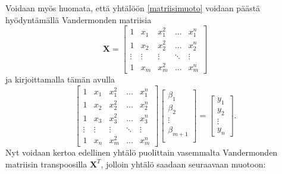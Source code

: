 \documentclass[12pt,a4paper,titlepage]{article}
\newcommand{\matr}[1]{\bm{#1}}
\newcommand{\transpose}[1]{{#1}^T}
\begin{document}
Voidaan myös huomata, että yhtälöön \ref{matriisimuoto} voidaan päästä hyödyntämällä Vandermonden matriisia \cite{vandermonde}
\begin{equation} \label{vandermonde}
	\matr{X} = 
	\begin{bmatrix}
		1 & x_{1} & x_{1}^2 & ...    & x_{1}^n \\
		1 & x_{2} & x_{2}^2 & ...    & x_{2}^n \\
		\vdots    &  \vdots & \vdots  & \ddots & \vdots  \\
		1 & x_{m} & x_{m}^2 &    ... & x_{m}^n
	\end{bmatrix}
\end{equation}
ja kirjoittamalla tämän avulla
\begin{equation} \label{matriiseilla}
	\begin{bmatrix}
			1 & x_{1} & x_{1}^2 & ...    & x_{1}^n \\
			1  & x_{2}& x_{2}^2 & ...    & x_{2}^n \\
			1  & x_{3}& x_{3}^2 & ...    & x_{3}^n \\
			\vdots  & \vdots  & \vdots & \ddots & \vdots  \\
			1  & x_{n}& x_{m}^2 &    ... & x_{m}^n
	\end{bmatrix}
	\begin{bmatrix}
		\beta_1 \\
		\beta_2 \\
		\vdots \\
		\beta_{m+1} \\
	\end{bmatrix}
	=
	\begin{bmatrix}
		y_1 \\
		y_2 \\
		\vdots \\
		y_n
	\end{bmatrix}.
\end{equation}
Nyt voidaan kertoa edellinen yhtälö puolittain vasemmalta Vandermonden matriisin transpoosilla $\transpose{\matr{X}}$, jolloin yhtälö saadaan seuraavaan muotoon:
\end{document}
